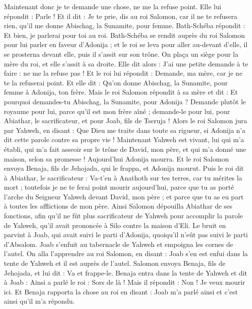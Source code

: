 \begin{multicols}{2}
Maintenant donc je te demande une chose, ne me la refuse point. Elle lui répondit : Parle !
Et il dit : Je te prie, dis au roi Salomon, car il ne te refusera rien, qu'il me donne Abischag, la Sunamite, pour femme.
Bath-Schéba répondit : Et bien, je parlerai pour toi au roi.
Bath-Schéba se rendit auprès du roi Salomon pour lui parler en faveur d’Adonija ; et le roi se leva pour aller au-devant d’elle, il se prosterna devant elle, puis il s'assit sur son trône. On plaça un siège pour la mère du roi, et elle s'assit à sa droite.
Elle dit alors : J'ai une petite demande à te faire : ne me la refuse pas ! Et le roi lui répondit : Demande, ma mère, car je ne te la refuserai point.
Et elle dit : Qu'on donne Abischag, la Sunamite, pour femme à Adonija, ton frère.
Mais le roi Salomon répondit à sa mère et dit : Et pourquoi demandes-tu Abischag, la Sunamite, pour Adonija ? Demande plutôt le royaume pour lui, parce qu'il est mon frère aîné ; demande-le pour lui, pour Abiathar, le sacrificateur, et pour Joab, fils de Tseruja !
Alors le roi Salomon jura par Yahweh, en disant : Que Dieu me traite dans toute sa rigueur, si Adonija n'a dit cette parole contre sa propre vie !
Maintenant Yahweh est vivant, lui qui m'a établi, qui m'a fait asseoir sur le trône de David, mon père, et qui m'a donné une maison, selon sa promesse ! Aujourd’hui Adonija mourra.
Et le roi Salomon envoya Benaja, fils de Jehojada, qui le frappa, et Adonija mourut.
Puis le roi dit à Abiathar, le sacrificateur : Va-t'en à Anathoth sur tes terres, car tu mérites la mort ; toutefois je ne te ferai point mourir aujourd'hui, parce que tu as porté l'arche du Seigneur Yahweh devant David, mon père ; et parce que tu as eu part à toutes les afflictions de mon père.
Ainsi Salomon dépouilla Abiathar de ses fonctions, afin qu'il ne fût plus sacrificateur de Yahweh pour accomplir la parole de Yahweh, qu'il avait prononcée à Silo contre la maison d'Eli.
Le bruit en parvint à Joab, qui avait suivi le parti d’Adonija, quoiqu'il n’eût pas suivi le parti d’Absalom. Joab s'enfuit au tabernacle de Yahweh et empoigna les cornes de l'autel.
On alla l’apprendre au roi Salomon, en disant : Joab s'en est enfui dans la tente de Yahweh et il est auprès de l'autel. Salomon envoya Benaja, fils de Jehojada, et lui dit : Va et frappe-le.
Benaja entra dans la tente de Yahweh et dit à Joab : Ainsi a parlé le roi : Sors de là ! Mais il répondit : Non ! Je veux mourir ici. Et Benaja rapporta la chose au roi en disant : Joab m'a parlé ainsi et c’est ainsi qu’il m’a répondu.

\end{multicols}
